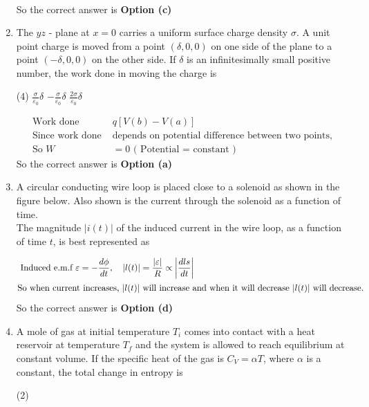 \begin{enumerate}
\begin{answer}
\begin{align*}
	\end{align*}
		So the correct answer is \textbf{Option (c)}
\end{answer}
\item The $y z$ - plane at $x=0$ carries a uniform surface charge density $\sigma$. A unit point charge is moved from a point $(\delta, 0,0)$ on one side of the plane to a point $(-\delta, 0,0)$ on the other side. If $\delta$ is an infinitesimally small positive number, the work done in moving the charge is
 \begin{tasks}(4)
	\task[\textbf{b.}]$\frac{\sigma}{\varepsilon_{0}} \delta$
	\task[\textbf{c.}]$-\frac{\sigma}{\varepsilon_{0}} \delta$
	\task[\textbf{d.}]$\frac{2 \sigma}{\varepsilon_{0}} \delta$ 
\end{tasks}
\begin{answer}
	\begin{align*}
	\text { Work done }& q[V(b)-V(a)]\\
	\text { Since work done }&\text{depends on potential difference between two points, }\\
\text{	So }W&=0
\text{	( Potential = constant )}
	\end{align*}
	So the correct answer is \textbf{Option (a)}
\end{answer}
\item A circular conducting wire loop is placed close to a solenoid as shown in the figure below. Also shown is the current through the solenoid as a function of time.	\\
The magnitude $|i(t)|$ of the induced current in the wire loop, as a function of time $t$, is best represented as
\begin{answer}
	\begin{align*}
	\text { Induced e.m.f } \varepsilon&=-\frac{d \phi}{d t}, \quad|l(t)|=\frac{|\varepsilon|}{R} \propto\left|\frac{d l s}{d t}\right|\\
	\intertext{So when current increases, $|l(t)|$ will increase and when it will decrease $|l(t)|$ will decrease.}
	\end{align*}
		So the correct answer is \textbf{Option (d)}
\end{answer}
\item A mole of gas at initial temperature $T_{i}$ comes into contact with a heat reservoir at temperature $T_{f}$ and the system is allowed to reach equilibrium at constant volume. If the specific heat of the gas is $C_{V}=\alpha T$, where $\alpha$ is a constant, the total change in entropy is
 \begin{tasks}(2)

\end{tasks}
\end{enumerate}
